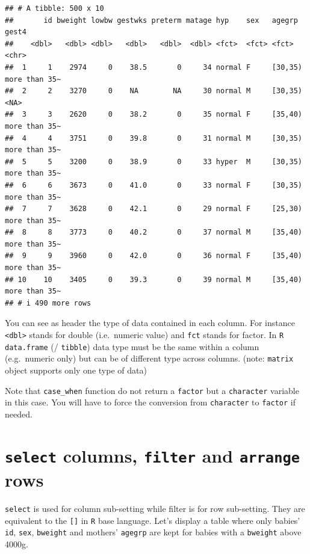 \documentclass[
]{book}
\theoremstyle{definition}
\theoremstyle{definition}
\theoremstyle{definition}
\theoremstyle{definition}
\theoremstyle{remark}
\begin{document}
\begin{verbatim}
## # A tibble: 500 x 10
##       id bweight lowbw gestwks preterm matage hyp    sex   agegrp  gest4        
##    <dbl>   <dbl> <dbl>   <dbl>   <dbl>  <dbl> <fct>  <fct> <fct>   <chr>        
##  1     1    2974     0    38.5       0     34 normal F     [30,35) more than 35~
##  2     2    3270     0    NA        NA     30 normal M     [30,35) <NA>         
##  3     3    2620     0    38.2       0     35 normal F     [35,40) more than 35~
##  4     4    3751     0    39.8       0     31 normal M     [30,35) more than 35~
##  5     5    3200     0    38.9       0     33 hyper  M     [30,35) more than 35~
##  6     6    3673     0    41.0       0     33 normal F     [30,35) more than 35~
##  7     7    3628     0    42.1       0     29 normal F     [25,30) more than 35~
##  8     8    3773     0    40.2       0     37 normal M     [35,40) more than 35~
##  9     9    3960     0    42.0       0     36 normal F     [35,40) more than 35~
## 10    10    3405     0    39.3       0     39 normal M     [35,40) more than 35~
## # i 490 more rows
\end{verbatim}

You can see as header the type of data contained in each column.
For instance \texttt{\textless{}dbl\textgreater{}} stands for double (i.e.~numeric value) and \texttt{fct}
stands for factor.
In \texttt{R} \texttt{data.frame} (/ \texttt{tibble}) data type
must be the same within a column (e.g.~numeric only) but can be of different type across columns. (note: \texttt{matrix} object supports only one type of data)

Note that \texttt{case\_when} function do not return a \texttt{factor} but a \texttt{character} variable in this case.
You will have to force the conversion from \texttt{character} to \texttt{factor} if needed.

\section{\texorpdfstring{\texttt{select} columns, \texttt{filter} and \texttt{arrange} rows}{select columns, filter and arrange rows}}\label{select-columns-filter-and-arrange-rows}

\texttt{select} is used for column sub-setting while filter is for row sub-setting.
They are equivalent to the \texttt{{[}{]}} in \texttt{R} base language.
Let's display a table where only babies' \texttt{id}, \texttt{sex}, \texttt{bweight} and mothers'
\texttt{agegrp} are kept for babies with a \texttt{bweight} above 4000g.
\end{document}
